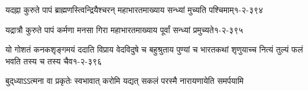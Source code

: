 \annotwolineshloka
{यदह्ना कुरुते पापं ब्राह्मणस्त्विन्द्रियैश्चरन्}
{महाभारतमाख्याय सन्ध्यां मुच्यति पश्चिमाम्}{१-२-३९४}

\annotwolineshloka
{यद्रात्रौ कुरुते पापं कर्मणा मनसा गिरा}
{महाभारतमाख्याय पूर्वां सन्ध्यां प्रमुच्यते}{१-२-३९५}

\annofourlineindentedshloka
{यो गोशतं कनकशृङ्गमयं ददाति}
{विप्राय वेदविदुषे च बहुश्रुताय}
{पुण्यां च भारतकथां शृणुयाच्च नित्यं}
{तुल्यं फलं भवति तस्य च तस्य चैव}{१-२-३९६}

{बुद्‌ध्याऽऽत्मना वा प्रकृतेः स्वभावात्}
{करोमि यद्यत् सकलं परस्मै}
{नारायणायेति समर्पयामि}

\hyperref[sec:start]{\closesection}